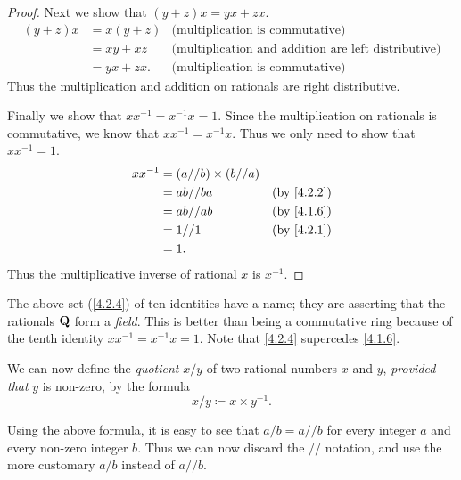 \begin{proof}
  Next we show that \((y + z)x = yx + zx\).
  \begin{align*}
    (y + z)x & = x(y + z) & \text{(multiplication is commutative)}                     \\
             & = xy + xz  & \text{(multiplication and addition are left distributive)} \\
             & = yx + zx. & \text{(multiplication is commutative)}
  \end{align*}
  Thus the multiplication and addition on rationals are right distributive.

  Finally we show that \(xx^{-1} = x^{-1}x = 1\).
  Since the multiplication on rationals is commutative, we know that \(xx^{-1} = x^{-1}x\).
  Thus we only need to show that \(xx^{-1} = 1\).
  \begin{align*}
    xx^{-1} & = (a // b) \times (b // a)                            \\
            & = ab // ba                 & \text{(by \cref{4.2.2})} \\
            & = ab // ab                 & \text{(by \cref{4.1.6})} \\
            & = 1 // 1                   & \text{(by \cref{4.2.1})} \\
            & = 1.
  \end{align*}
  Thus the multiplicative inverse of rational \(x\) is \(x^{-1}\).
\end{proof}

\begin{remark}\label{4.2.5}
  The above set (\cref{4.2.4}) of ten identities have a name;
  they are asserting that the rationals \(\mathbf{Q}\) form a \emph{field}.
  This is better than being a commutative ring because of the tenth identity \(xx^{-1} = x^{-1}x = 1\).
  Note that \cref{4.2.4} supercedes \cref{4.1.6}.
\end{remark}

\begin{note}
  We can now define the \emph{quotient} \(x / y\) of two rational numbers \(x\) and \(y\), \emph{provided that} \(y\) is non-zero, by the formula
  \[
    x / y \coloneqq x \times y^{-1}.
  \]
\end{note}

\begin{note}
  Using the above formula, it is easy to see that \(a / b = a // b\) for every integer \(a\) and every non-zero integer \(b\).
  Thus we can now discard the \(//\) notation, and use the more customary \(a / b\) instead of \(a // b\).
\end{note}

